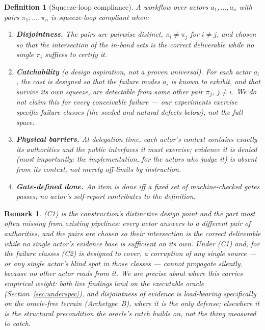 \documentclass[11pt]{article}
\newtheorem{definition}{Definition}
\newtheorem{remark}{Remark}
\begin{document}
\begin{definition}[Squeeze-loop compliance]
\label{def:compliance}
A workflow over actors $a_1,\dots,a_n$ with pairs $\pi_1,\dots,\pi_n$ is
\emph{squeeze-loop compliant} when:
\begin{enumerate}
\item[\textbf{(C1)}] \textbf{Disjointness.} The pairs are pairwise distinct,
  $\pi_i \neq \pi_j$ for $i \neq j$, and chosen so that the intersection of
  the in-band sets is the correct deliverable while no single $\pi_i$ suffices
  to certify it.
\item[\textbf{(C2)}] \textbf{Catchability} (a design aspiration, not a proven
  universal). For each actor $a_i$, the cast is \emph{designed} so that the failure
  modes $a_i$ is known to exhibit, and that survive its own squeeze, are detectable
  from some other pair $\pi_j$, $j \neq i$. We do not claim this for \emph{every}
  conceivable failure --- our experiments exercise specific failure classes (the
  seeded and natural defects below), not the full space.
\item[\textbf{(C3)}] \textbf{Physical barriers.} At delegation time, each
  actor's context contains exactly its authorities and the public interfaces
  it must exercise; evidence it is denied (most importantly: the
  implementation, for the actors who judge it) is absent from its context, not
  merely off-limits by instruction.
\item[\textbf{(C4)}] \textbf{Gate-defined done.} An item is \emph{done} iff a
  fixed set of machine-checked gates passes; no actor's self-report
  contributes to the definition.
\end{enumerate}
\end{definition}

\begin{remark}
(C1) is the construction's distinctive design point and the part most often missing from existing
pipelines: \emph{every actor answers to a different pair of authorities, and
the pairs are chosen so their intersection is the correct deliverable while no
single actor's evidence base is sufficient on its own.} Under (C1) and, for the
failure classes (C2) is designed to cover, a corruption of any single source --- or any
single actor's blind spot in those classes --- cannot propagate silently, because no other
actor reads from it. We are precise about where this carries \emph{empirical} weight: both live
findings land on the executable oracle (Section~\ref{sec:underspec}), and disjointness of evidence is
load-bearing specifically on the \emph{oracle-free} terrain (Archetype~B), where it is the only defense;
elsewhere it is the structural precondition the oracle's catch builds on, not the thing measured to
catch.
\end{remark}
\end{document}
